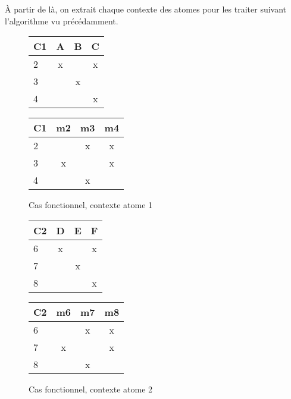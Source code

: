 À partir de là, on extrait chaque contexte des atomes pour les traiter suivant l'algorithme vu précédamment.

\begin{figure}[H]
	\begin{minipage}[c]{0.5\textwidth}
	\begin{center}
		\begin{tabular}{ l | c c c }
			C1 & A & B & C \\
			\hline
			2 & x & & x \\
			3 & & x & \\
			4 & & & x \\
		\end{tabular}
	\end{center}
	\end{minipage}
	\begin{minipage}[c]{0.5\textwidth}
	\begin{center}
		\begin{tabular}{ l | c c c }
			C1 & m2 & m3 & m4 \\
			\hline
			2 & & x & x \\
			3 & x & & x \\
			4 & & x & \\
		\end{tabular}
	\end{center}
	\end{minipage}
	\caption{Cas fonctionnel, contexte atome 1}
\end{figure}

\begin{figure}[H]
	\begin{minipage}[c]{0.5\textwidth}
	\begin{center}
		\begin{tabular}{ l | c c c }
			C2 & D & E & F \\
			\hline
			6 & x & & x \\
			7 & & x & \\
			8 & & & x \\
		\end{tabular}
	\end{center}
	\end{minipage}
	\begin{minipage}[c]{0.5\textwidth}
	\begin{center}
		\begin{tabular}{ l | c c c }
			C2 & m6 & m7 & m8 \\
			\hline
			6 & & x & x \\
			7 & x & & x \\
			8 & & x & \\
		\end{tabular}
	\end{center}
	\end{minipage}
	\caption{Cas fonctionnel, contexte atome 2}
\end{figure}

